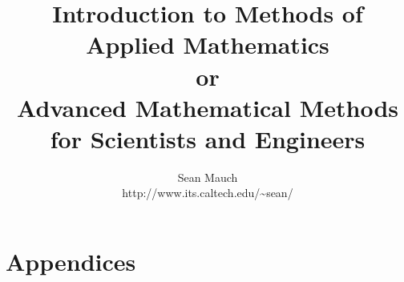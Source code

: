 \documentclass{book}
\title{Introduction to Methods of Applied Mathematics\\
        or\\
        Advanced Mathematical Methods for Scientists and Engineers}
\author{Sean Mauch\\
  http://www.its.caltech.edu/{\~{}}sean/
}
\begin{document}
%
\maketitle

\frontmatter

\tableofcontents






\mainmatter















\part{Appendices}



\backmatter




\printindex
\end{document}
